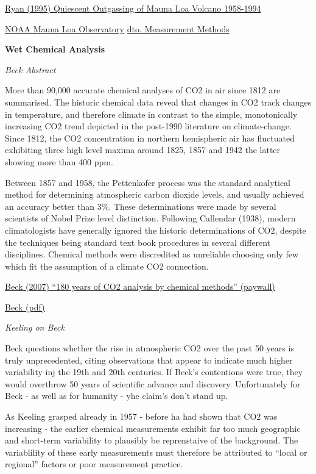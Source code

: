 \documentclass[
]{book}
\begin{document}
\href{https://web.archive.org/web/19980114152259/http://mloserv.mlo.hawaii.gov/publish/steve/VolcCO2.htm}{Ryan (1995) Quiescent Outgassing of Mauna Loa Volcano 1958-1994}

\href{https://gml.noaa.gov/obop/mlo/}{NOAA Mauna Loa Observatory}
\href{https://gml.noaa.gov/ccgg/about/co2_measurements.html}{dto. Measurement Methods}

\textbf{Wet Chemical Analysis}

\emph{Beck Abstract}

More than 90,000 accurate chemical analyses of CO2 in air since 1812 are summarised. The historic chemical data reveal that changes in CO2 track changes in temperature, and therefore climate in contrast to the simple, monotonically increasing CO2 trend depicted in the post-1990 literature on climate-change. Since 1812, the CO2 concentration in northern hemispheric air has fluctuated exhibiting three high level maxima around 1825, 1857 and 1942 the latter showing more than 400 ppm.

Between 1857 and 1958, the Pettenkofer process was the standard analytical method for determining atmospheric carbon dioxide levels, and usually achieved an accuracy better than 3\%. These determinations were made by several scientists of Nobel Prize level distinction. Following Callendar (1938), modern climatologists have generally ignored the historic determinations of CO2, despite the techniques being standard text book procedures in several different disciplines. Chemical methods were discredited as unreliable choosing only few which fit the assumption of a climate CO2 connection.

\href{https://journals.sagepub.com/doi/10.1260/095830507780682147}{Beck (2007) ``180 years of CO2 analysis by chemical methods'' (paywall)}

\href{pdf/Beck_CO2_Chemical.pdf}{Beck (pdf)}

\emph{Keeling on Beck}

Beck questions whether the rise in atmospheric CO2 over the past 50 years
is truly unprecedented, citing observations that appear to indicate much
higher variability inj the 19th and 20th centuries.
If Beck's contentions were true, they would overthrow 50 years of scientific advance
and discovery.
Unfortunately for Beck - as well as for humanity - yhe claim's don't stand up.

As Keeling grasped already in 1957 - before ha had shown that CO2 was increasing -
the earlier chemical measurements exhibit far too much geographic and short-term variability to plausibly be reprenstaive of the background.
The variablility of these early measurements must therefore be attributed to ``local or regional'' factors or poor measurement practice.
\end{document}
